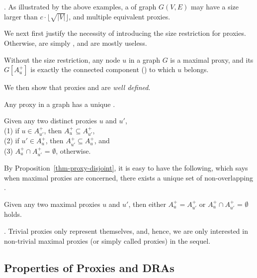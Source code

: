 \vspace{-1ex}
. As illustrated by the above examples,  a \dra of graph $G(V, E)$ may have a size larger than $c\cdot\lfloor\sqrt{|V|}\rfloor$,
and multiple equivalent proxies.


We next first justify the necessity of introducing the size restriction for proxies.  Otherwise, \dras are simply \ccs, and are mostly useless.


\begin{prop}
\label{prop-proxy-cc} Without the size restriction, any node $u$ in a graph $G$ is a maximal proxy,
and its \dra $G[A^+_u]$ is exactly the connected component (\cc) to which $u$ belongs.
\end{prop}


We then show that proxies and \dras are {\em well defined}.


\begin{prop}
\label{prop-proxy-unique-dra} Any proxy in a graph has a unique \dra.
\end{prop}


\begin{prop}
\label{thm-proxy-disjoint} Given any two distinct proxies $u$ and $u'$, \\
(1) if $u\in A^+_{u'}$, then $A^+_{u}\subseteq A^+_{u'}$, \\
(2) if $u'\in A^+_{u}$, then $A^+_{u'}\subseteq A^+_{u}$,  and \\
(3) $A^+_{u}\cap A^+_{u'}$ = $\emptyset$, otherwise.
\end{prop}


By Proposition~\ref{thm-proxy-disjoint}, it is easy to have the following, which says when maximal proxies are concerned, there exists a unique set of non-overlapping \dras.

\begin{cor}
\label{cor-proxy-disjoint} Given any two maximal proxies $u$ and $u'$, then either $A^+_{u} = A^+_{u'}$ or $A^+_{u}\cap A^+_{u'}$ = $\emptyset$ holds.
\end{cor}


\vspace{-1ex}
. Trivial proxies only represent themselves, and, hence, we are only interested in non-trivial maximal proxies (or simply called proxies) in the sequel.


\subsection{Properties of Proxies and DRAs}
\label{subsec-proxy-properties}

